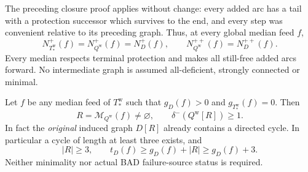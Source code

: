 The preceding closure proof applies without change: every added arc
has a tail with a protection successor which survives to the end, and
every step was convenient relative to its preceding graph. Thus, at
every global median feed $f$,
\[
 N_{T^{\mathrm w}_*}^+(f)=N_{Q^{\mathrm w}}^+(f)=N_D^+(f),\qquad
 N_{Q^{\mathrm w}}^{++}(f)=N_D^{++}(f).
\]
Every median respects terminal protection and makes all still-free
added arcs forward. No intermediate graph is assumed all-deficient,
strongly connected or minimal.

\begin{theorem}
\label{thm:weak-closure-zero-feed-cycle}
Let $f$ be any median feed of $T^{\mathrm w}_*$ such that
$g_D(f)>0$ and $g_{T^{\mathrm w}_*}(f)=0$. Then
\[
 R=\mathcal M_{Q^{\mathrm w}}(f)\ne\varnothing,
 \qquad \delta^-(Q^{\mathrm w}[R])\ge1.
\]
In fact the \emph{original} induced graph $D[R]$ already contains a
directed cycle. In particular a cycle of length at least three exists, and
\[
 |R|\ge3,\qquad
 t_D(f)\ge g_D(f)+|R|\ge g_D(f)+3.
\]
Neither minimality nor actual BAD failure-source status is required.
\end{theorem}
